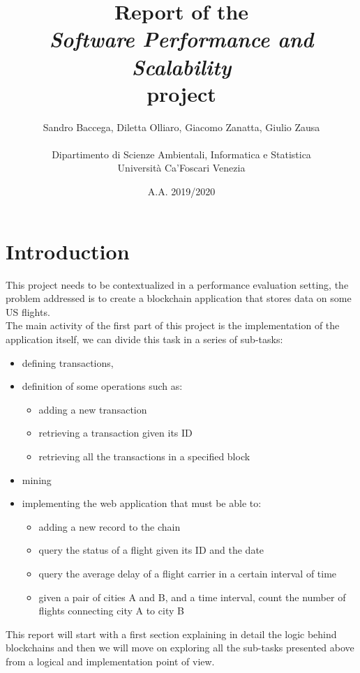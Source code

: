 \documentclass[12pt]{article}
\begin{document}

\date{A.A. 2019/2020}
\author{Sandro Baccega, Diletta Olliaro, Giacomo Zanatta, Giulio Zausa\\\ \\ Dipartimento di Scienze Ambientali, Informatica e Statistica\\ Università Ca'Foscari Venezia}
\title{Report of the\\ \textit{Software Performance and Scalability}\\ project}
\maketitle
\newpage
\tableofcontents
\newpage
{}
\section{Introduction}
This project needs to be contextualized in a performance evaluation setting, the problem addressed is to create a blockchain application that stores data on some US flights.\\
The main activity of the first part of this project is the implementation of the application itself, we can divide this task in a series of sub-tasks: 
\begin{itemize}
\item defining transactions,
\item definition of some operations such as:
\begin{itemize}
\item adding a new transaction
\item retrieving a transaction given its ID
\item retrieving all the transactions in a specified block
\end{itemize}
\item mining 
\item implementing the web application that must be able to:
\begin{itemize}
\item adding a new record to the chain
\item query the status of a flight given its ID and the date
\item query the average delay of a flight carrier in a certain interval of time
\item given a pair of cities A and B, and a time interval, count the number of flights connecting city A to city B
\end{itemize}
\end{itemize}
This report will start with a first section explaining in detail the logic behind blockchains and then we will move on exploring all the sub-tasks presented above from a logical and implementation point of view.
\end{document}
